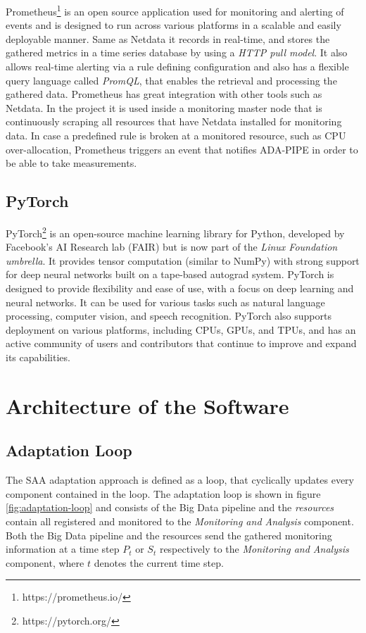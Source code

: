     Prometheus\footnote{https://prometheus.io/} is an open source application used for monitoring and alerting of events and is designed to run across various platforms in a scalable and easily deployable manner.
    Same as Netdata it records in real-time, and stores the gathered metrics in a time series database by using a \emph{HTTP pull model}. It also allows real-time alerting via a rule defining configuration and also has a flexible query language called \emph{PromQL}, that enables the retrieval and processing the gathered data. Prometheus has great integration with other tools such as Netdata.
    In the project it is used inside a monitoring master node that is continuously scraping all resources that have Netdata installed for monitoring data. In case a predefined rule is broken at a monitored resource, such as CPU over-allocation, Prometheus triggers an event that notifies ADA-PIPE in order to be able to take measurements.



  \subsection{PyTorch}
  \label{sec:pytorch-evaluation-setup}
    PyTorch\footnote{https://pytorch.org/} is an open-source machine learning library for Python, developed by Facebook's AI Research lab (FAIR) but is now part of the \emph{Linux Foundation umbrella}. It provides tensor computation (similar to NumPy) with strong support for deep neural networks built on a tape-based autograd system. PyTorch is designed to provide flexibility and ease of use, with a focus on deep learning and neural networks. It can be used for various tasks such as natural language processing, computer vision, and speech recognition.
    PyTorch also supports deployment on various platforms, including CPUs, GPUs, and TPUs, and has an active community of users and contributors that continue to improve and expand its capabilities.
  

\section{Architecture of the Software}

  \subsection{Adaptation Loop}


  The SAA adaptation approach is defined as a loop, that cyclically updates every component contained in the loop.
  The adaptation loop is shown in figure \ref{fig:adaptation-loop} and consists of the Big Data pipeline and the \emph{resources} contain all registered and monitored to the \emph{Monitoring and Analysis} component. 
  Both the Big Data pipeline and the resources send the gathered monitoring information at a time step $P_t$ or $S_t$ respectively to the \emph{Monitoring and Analysis} component, where $t$ denotes the current time step.

